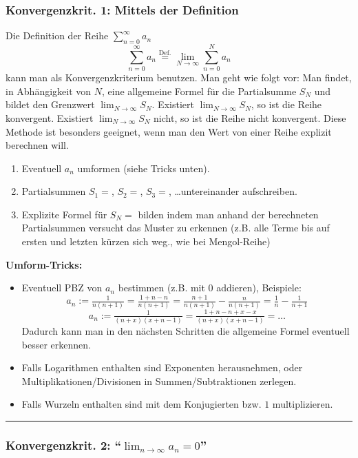 \documentclass[a4paper,landscape,8pt]{extarticle}
\newcommand{\sep}{\vspace{5pt}\noindent\hrule\vspace{5pt}}
\begin{document}
\begin{multicols*}{4}
\subsubsection{Konvergenzkrit. 1: Mittels der Definition}

Die Definition der Reihe $\sum_{n=0}^\infty a_n$
\[
\sum_{n=0}^{\infty}a_n \stackrel{\text{Def.}}{=} \lim_{N\to \infty}
\sum_{n=0}^{N} a_n
\]
kann man als Konvergenzkriterium benutzen. Man geht wie folgt vor: Man findet,
in Abhängigkeit von $N$, eine allgemeine Formel für die Partialsumme $S_N$ und
bildet den Grenzwert $\lim_{N\to\infty} S_N$. Existiert $\lim_{N\to\infty} S_N$,
so ist die Reihe konvergent. Existiert $\lim_{N\to\infty} S_N$ nicht, so ist die
Reihe nicht konvergent. Diese Methode ist besonders geeignet, wenn man den Wert
von einer Reihe explizit berechnen will.


\Vorgehen 

\begin{enumerate}
  \item Eventuell $a_n$ umformen (siehe Tricks unten).
  \item Partialsummen $S_1=$, $S_2=$, $S_3=$, \ldots untereinander aufschreiben.
  \item Explizite Formel für $S_N=$ bilden indem man anhand der berechneten
  Partialsummen versucht das Muster zu erkennen (z.B.
  alle Terme bis auf ersten und letzten kürzen sich weg., wie bei Mengol-Reihe)
\end{enumerate}

\textbf{Umform-Tricks:}
\begin{itemize}
  \item Eventuell PBZ von $a_n$ bestimmen (z.B. mit $0$ addieren), Beispiele:
	\[
	a_n:=
	\tfrac{1}{n(n+1)} = \tfrac{1+n-n}{n(n+1)} = \tfrac{n+1}{n(n+1)} -
	\tfrac{n}{n(n+1)} = \tfrac{1}{n} - \tfrac{1}{n+1}
	\]
	\[
	a_n:= \tfrac{1}{(n+x)(x+n-1)} = \tfrac{1+n-n+x-x}{(n+x)(x+n-1)} = \ldots
	\]
	Dadurch kann man in den nächsten Schritten die allgemeine Formel eventuell
	besser erkennen.
  \item Falls Logarithmen enthalten sind Exponenten herausnehmen, oder
  Multiplikationen/Divisionen in Summen/Subtraktionen zerlegen.
  \item Falls Wurzeln enthalten sind mit dem Konjugierten bzw. $1$
  multiplizieren.  
\end{itemize}

\sep

\subsubsection{Konvergenzkrit. 2: ``$\lim_{n\to \infty} a_n = 0$''}


\end{multicols*}
\end{document}
